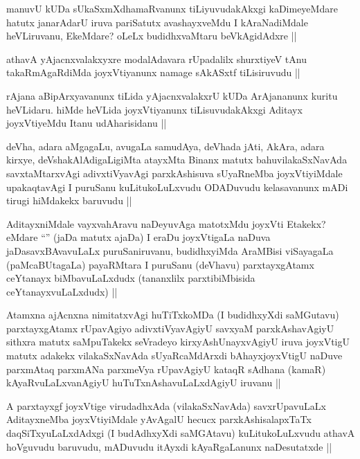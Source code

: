 
\begin{artha}
manuvU kUDa sUkaSxmXdhamaRvanunx tiLiyuvudakAkxgi kaDimeyeMdare hatutx janarAdarU iruva pariSatutx avashayxveMdu I kAraNadiMdale heVLiruvanu, EkeMdare? oLeLx budidhxvaMtaru beVkAgidAdxre ||
\end{artha}

\begin{artha}
athavA yAjacnxvalakxyxre modalAdavara rUpadalilx shurxtiyeV tAnu takaRmAgaRdiMda joyxVtiyanunx namage sAkASxtf tiLisiruvudu ||
\end{artha}

\begin{artha}
rAjana aBipArxyavanunx tiLida yAjacnxvalakxrU kUDa ArAjananunx kuritu heVLidaru. hiMde heVLida joyxVtiyanunx tiLisuvudakAkxgi Aditayx joyxVtiyeMdu Itanu udAharisidanu ||
\end{artha}

\begin{artha}
deVha, adara aMgagaLu, avugaLa samudAya, deVhada jAti, AkAra, adara kirxye, deVshakAlAdigaLigiMta atayxMta Binanx matutx bahuvilakaSxNavAda savxtaMtarxvAgi adivxtiVyavAgi parxkAshisuva sUyaRneMba joyxVtiyiMdale upakaqtavAgi I puruSanu kuLitukoLuLxvudu ODADuvudu kelasavanunx mADi tirugi hiMdakekx baruvudu ||
\end{artha}

\begin{artha}
AditayxniMdale vayxvahAravu naDeyuvAga matotxMdu joyxVti Etakekx? eMdare ``\stext'' (jaDa matutx ajaDa) I eraDu joyxVtigaLa naDuva jaDasavxBAvavuLaLx puruSaniruvanu, budidhxyiMda AraMBisi viSayagaLa (paMcaBUtagaLa) payaRMtara I puruSanu (deVhavu) parxtayxgAtamx ceYtanayx biMbavuLaLxdudx (tananxlilx parxtibiMbisida ceYtanayxvuLaLxdudx) ||
\end{artha}

\begin{artha}
Atamxna ajAcnxna nimitatxvAgi huTiTxkoMDa (I budidhxyXdi saMGutavu) parxtayxgAtamx rUpavAgiyo adivxtiVyavAgiyU savxyaM parxkAshavAgiyU sithxra matutx saMpuTakekx seVradeyo kirxyAshUnayxvAgiyU iruva joyxVtigU matutx adakekx vilakaSxNavAda sUyaRcaMdArxdi bAhayxjoyxVtigU naDuve parxmAtaq parxmANa parxmeVya rUpavAgiyU kataqR sAdhana (kamaR) kAyaRvuLaLxvanAgiyU huTuTxnAshavuLaLxdAgiyU iruvanu ||
\end{artha}

\begin{artha}
A parxtayxgf joyxVtige virudadhxAda (vilakaSxNavAda) savxrUpavuLaLx AditayxneMba joyxVtiyiMdale yAvAgalU hecucx parxkAshisalapxTaTx daqSiTxyuLaLxdAdxgi (I budAdhxyXdi saMGAtavu) kuLitukoLuLxvudu athavA hoVguvudu baruvudu, mADuvudu itAyxdi kAyaRgaLanunx naDesutatxde ||
\end{artha}

